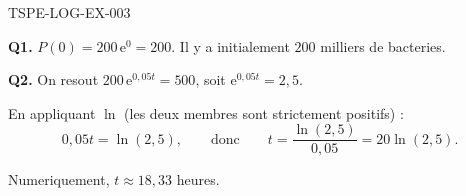 \begin{corrige}{TSPE-LOG-EX-003}

\textbf{Q1.} $P(0) = 200\,\mathrm{e}^0 = 200$. Il y a initialement $200$ milliers de bacteries.

\textbf{Q2.} On resout $200\,\mathrm{e}^{0{,}05t} = 500$, soit $\mathrm{e}^{0{,}05t} = 2{,}5$.

En appliquant $\ln$ (les deux membres sont strictement positifs) :
\[
  0{,}05t = \ln(2{,}5), \qquad \text{donc} \qquad t = \frac{\ln(2{,}5)}{0{,}05} = 20\ln(2{,}5).
\]

Numeriquement, $t \approx 18{,}33$ heures.

\end{corrige}

